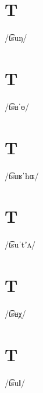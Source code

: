 \documentclass[10pt,a4paper,twoside]{book}
\begin{document}
\section*{T}

\begin{multicols}{3}
 {/t͡suŋ/} {}
\end{multicols}

\section*{T}

\begin{multicols}{3}
 {/t͡sʉˈɵ/} {}
\end{multicols}

\section*{T}

\begin{multicols}{3}
 {/t͡sʉʁˈhɶ/} {}
\end{multicols}

\section*{T}

\begin{multicols}{3}
 {/t͡suˈtʼʌ/} {}
\end{multicols}

\section*{T}

\begin{multicols}{3}
 {/t͡sʉχ/} {}
\end{multicols}

\section*{T}

\begin{multicols}{3}
 {/t͡suǁ/} {}
\end{multicols}
\end{document}
